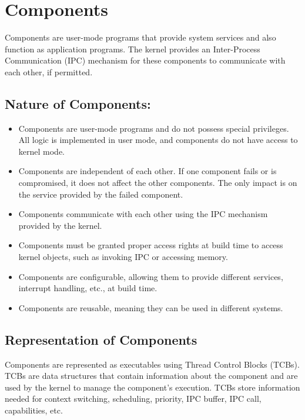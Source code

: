 \documentclass[
	a4paper, %
	11pt, %
	unnumberedsections, %
	twoside, %
]{LTJournalArticle}
\begin{document}
\section{Components}

Components are user-mode programs that provide system services and also function as application programs. The kernel provides an Inter-Process Communication (IPC) mechanism for these components to communicate with each other, if permitted.

\subsection{Nature of Components:}
\begin{itemize}
\item Components are user-mode programs and do not possess special privileges. All logic is implemented in user mode, and components do not have access to kernel mode.
\item Components are independent of each other. If one component fails or is compromised, it does not affect the other components. The only impact is on the service provided by the failed component.
\item Components communicate with each other using the IPC mechanism provided by the kernel.
\item Components must be granted proper access rights at build time to access kernel objects, such as invoking IPC or accessing memory.
\item Components are configurable, allowing them to provide different services, interrupt handling, etc., at build time.
\item Components are reusable, meaning they can be used in different systems.
\end{itemize}

\subsection*{Representation of Components}
Components are represented as executables using Thread Control Blocks (TCBs). TCBs are data structures that contain information about the component and are used by the kernel to manage the component's execution. TCBs store information needed for context switching, scheduling, priority, IPC buffer, IPC call, capabilities, etc.
\end{document}
